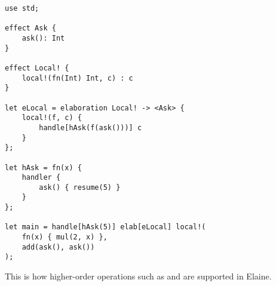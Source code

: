 \begin{lstlisting}[langauge=elaine,style=fancy]
use std;

effect Ask {
    ask(): Int
}

effect Local! {
    local!(fn(Int) Int, c) : c
}

let eLocal = elaboration Local! -> <Ask> {
    local!(f, c) {
        handle[hAsk(f(ask()))] c
    }
};

let hAsk = fn(x) {
    handler {
        ask() { resume(5) }
    }
};

let main = handle[hAsk(5)] elab[eLocal] local!(
    fn(x) { mul(2, x) },
    add(ask(), ask())
);
\end{lstlisting}

This is how higher-order operations such as  and  are supported in Elaine.